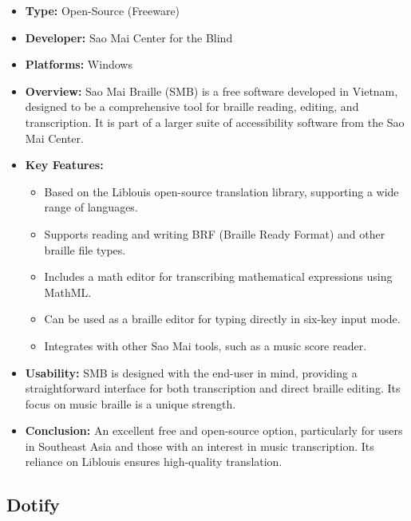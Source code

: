 \begin{itemize}
	\item \textbf{Type:} Open-Source (Freeware)
	\item \textbf{Developer:} Sao Mai Center for the Blind
	\item \textbf{Platforms:} Windows
	\item \textbf{Overview:} Sao Mai Braille (SMB) \supercite{SMB} is a free software developed in Vietnam, designed to be a comprehensive tool for braille reading, editing, and transcription. It is part of a larger suite of accessibility software from the Sao Mai Center.
	\item \textbf{Key Features:}
	      \begin{itemize}
		      \item Based on the Liblouis open-source translation library, supporting a wide range of languages.
		      \item Supports reading and writing BRF (Braille Ready Format) and other braille file types.
		      \item Includes a math editor for transcribing mathematical expressions using MathML.
		      \item Can be used as a braille editor for typing directly in six-key input mode.
		      \item Integrates with other Sao Mai tools, such as a music score reader.
	      \end{itemize}
	\item \textbf{Usability:} SMB is designed with the end-user in mind, providing a straightforward interface for both transcription and direct braille editing. Its focus on music braille is a unique strength.
	\item \textbf{Conclusion:} An excellent free and open-source option, particularly for users in Southeast Asia and those with an interest in music transcription. Its reliance on Liblouis ensures high-quality translation.
\end{itemize}

\subsection{Dotify}
\label{sub:dotify}

